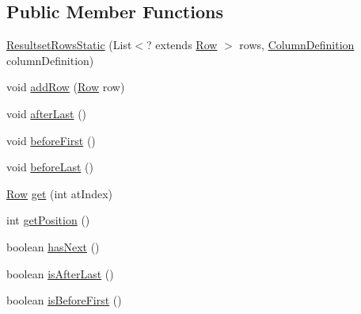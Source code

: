 \subsection*{Public Member Functions}
\begin{DoxyCompactItemize}
\item 
\mbox{\hyperlink{classcom_1_1mysql_1_1cj_1_1protocol_1_1a_1_1result_1_1_resultset_rows_static_af47b5dc1c99f77b340a0a7f14b9b261e}{Resultset\+Rows\+Static}} (List$<$? extends \mbox{\hyperlink{interfacecom_1_1mysql_1_1cj_1_1result_1_1_row}{Row}} $>$ rows, \mbox{\hyperlink{interfacecom_1_1mysql_1_1cj_1_1protocol_1_1_column_definition}{Column\+Definition}} column\+Definition)
\item 
void \mbox{\hyperlink{classcom_1_1mysql_1_1cj_1_1protocol_1_1a_1_1result_1_1_resultset_rows_static_a4546e3ad8ce7f65d7c37d306ec4a1e48}{add\+Row}} (\mbox{\hyperlink{interfacecom_1_1mysql_1_1cj_1_1result_1_1_row}{Row}} row)
\item 
void \mbox{\hyperlink{classcom_1_1mysql_1_1cj_1_1protocol_1_1a_1_1result_1_1_resultset_rows_static_a2714df97d4c52ca2993214815e6d5594}{after\+Last}} ()
\item 
void \mbox{\hyperlink{classcom_1_1mysql_1_1cj_1_1protocol_1_1a_1_1result_1_1_resultset_rows_static_a0621988f2c4896700500decf7b6298a2}{before\+First}} ()
\item 
void \mbox{\hyperlink{classcom_1_1mysql_1_1cj_1_1protocol_1_1a_1_1result_1_1_resultset_rows_static_ae4eeeb6d930a55f44a5c80338115ef96}{before\+Last}} ()
\item 
\mbox{\hyperlink{interfacecom_1_1mysql_1_1cj_1_1result_1_1_row}{Row}} \mbox{\hyperlink{classcom_1_1mysql_1_1cj_1_1protocol_1_1a_1_1result_1_1_resultset_rows_static_a142d0e620806f94e5e35b761587bda0d}{get}} (int at\+Index)
\item 
int \mbox{\hyperlink{classcom_1_1mysql_1_1cj_1_1protocol_1_1a_1_1result_1_1_resultset_rows_static_a3177c1c1350ee04c5d9ab5130e40e97f}{get\+Position}} ()
\item 
boolean \mbox{\hyperlink{classcom_1_1mysql_1_1cj_1_1protocol_1_1a_1_1result_1_1_resultset_rows_static_a286e065a006767e966320c2ab6d9d08d}{has\+Next}} ()
\item 
boolean \mbox{\hyperlink{classcom_1_1mysql_1_1cj_1_1protocol_1_1a_1_1result_1_1_resultset_rows_static_a7b010d9bacc8bb948e66a76d4ef4e0d4}{is\+After\+Last}} ()
\item 
boolean \mbox{\hyperlink{classcom_1_1mysql_1_1cj_1_1protocol_1_1a_1_1result_1_1_resultset_rows_static_adbab4e5b2490a9e147a79de4cc7d6e1d}{is\+Before\+First}} ()

\end{DoxyCompactItemize}

